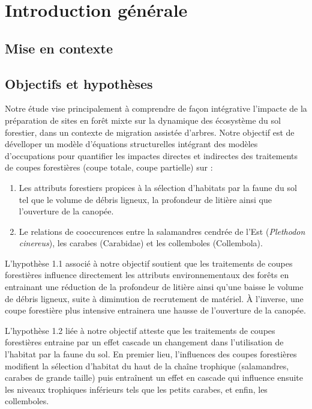 \chapter*{Introduction générale}         %
\label{chap-introduction}       %

\section*{Mise en contexte}
\label{sec:contexte}

\section*{Objectifs et hypothèses}
\label{sec:objectifs}

Notre étude vise principalement à comprendre de façon intégrative l'impacte de la préparation de sites en forêt mixte sur la dynamique des écosystème du sol forestier, dans un contexte de migration assistée d'arbres.
Notre objectif est de dévelloper un modèle d'équations structurelles intégrant des modèles d'occupations pour quantifier les impactes directes et indirectes des traitements de coupes forestières (coupe totale, coupe partielle) sur : 

\begin{enumerate}
    \item Les attributs forestiers propices à la sélection d'habitats par la faune du sol tel que le volume de débris ligneux, la profondeur de litière ainsi que l'ouverture de la canopée. 
    \item Le relations de cooccurences entre la salamandres cendrée de l'Est (\textit{Plethodon cinereus}), les carabes (Carabidae) et les collemboles (Collembola).
\end{enumerate}

L'hypothèse 1.1 associé à notre objectif soutient que les traitements de coupes forestières influence directement les attributs environnementaux des forêts en 
entrainant une réduction de la profondeur de litière ainsi qu'une baisse le volume de débris ligneux, suite à diminution de recrutement de matériel. 
À l'inverse, une coupe forestière plus intensive entrainera une hausse de l'ouverture de la canopée.

L'hypothèse 1.2 liée à notre objectif atteste que les traitements de coupes forestières entraine par un effet cascade un changement dans l'utilisation de l'habitat par la faune du sol. 
En premier lieu, l'influences des coupes forestières modifient la sélection d'habitat du haut de la chaîne trophique (salamandres, carabes de grande taille)
puis entraînent un effet en cascade qui influence ensuite les niveaux trophiques inférieurs tels que les petits carabes, 
et enfin, les collemboles.

\cleardoublepage



